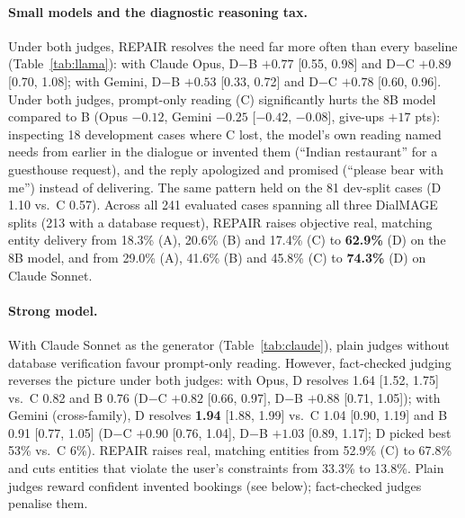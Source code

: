 \documentclass[11pt]{article}
\begin{document}
\paragraph{Small models and the diagnostic reasoning tax.} Under both judges, REPAIR resolves the need far more often than every baseline
(Table~\ref{tab:llama}): with Claude Opus, D$-$B $+0.77$ [0.55, 0.98] and D$-$C $+0.89$ [0.70, 1.08]; with
Gemini, D$-$B $+0.53$ [0.33, 0.72] and D$-$C $+0.78$ [0.60, 0.96]. Under both judges, prompt-only reading
(C) significantly hurts the 8B model compared to B (Opus $-0.12$, Gemini $-0.25$ [$-0.42$, $-0.08$], give-ups
$+17$ pts): inspecting 18 development cases where C lost, the model's own reading named needs from earlier in
the dialogue or invented them (``Indian restaurant'' for a guesthouse request), and the reply apologized and
promised (``please bear with me'') instead of delivering. The same pattern held on the 81 dev-split cases (D 1.10 vs.\ C 0.57). Across all 241 evaluated cases spanning
all three DialMAGE splits (213 with a database request), REPAIR raises objective real, matching entity
delivery from 18.3\% (A), 20.6\% (B) and 17.4\% (C) to \textbf{62.9\%} (D) on the 8B model, and from 29.0\%
(A), 41.6\% (B) and 45.8\% (C) to \textbf{74.3\%} (D) on Claude Sonnet.

\paragraph{Strong model.} With Claude Sonnet as the generator (Table~\ref{tab:claude}), plain judges without
database verification favour prompt-only reading. However, fact-checked judging reverses the picture under
both judges: with Opus, D resolves 1.64 [1.52, 1.75] vs.\ C 0.82 and B 0.76 (D$-$C $+0.82$ [0.66, 0.97],
D$-$B $+0.88$ [0.71, 1.05]); with Gemini (cross-family), D resolves \textbf{1.94} [1.88, 1.99] vs.\ C 1.04
[0.90, 1.19] and B 0.91 [0.77, 1.05] (D$-$C $+0.90$ [0.76, 1.04], D$-$B $+1.03$ [0.89, 1.17]; D picked
best 53\% vs.\ C 6\%). REPAIR raises real, matching entities from 52.9\% (C) to 67.8\% and cuts entities that
violate the user's constraints from 33.3\% to 13.8\%. Plain judges reward confident invented bookings (see
below); fact-checked judges penalise them.
\end{document}

